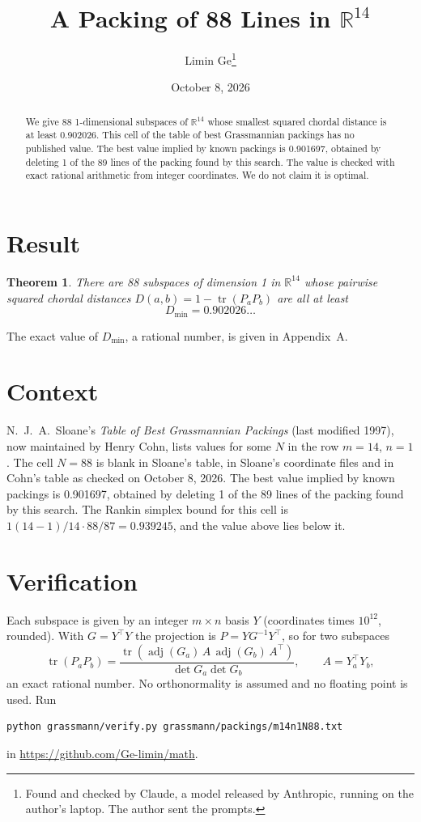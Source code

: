 \documentclass[11pt,a4paper]{article}
\title{A Packing of 88 Lines in $\mathbb{R}^{14}$}
\author{Limin Ge\thanks{Found and checked by Claude, a model released by Anthropic, running on the author's laptop. The author sent the prompts.}}
\date{October 8, 2026}
\newtheorem*{theorem}{Theorem}
\begin{document}
\maketitle
\begin{abstract}
We give 88 1-dimensional subspaces of $\mathbb{R}^{14}$ whose smallest squared chordal distance is at least 0.902026. This cell of the table of best Grassmannian packings has no published value. The best value implied by known packings is 0.901697, obtained by deleting 1 of the 89 lines of the packing found by this search. The value is checked with exact rational arithmetic from integer coordinates. We do not claim it is optimal.
\end{abstract}

\section{Result}
\begin{theorem}
There are 88 subspaces of dimension 1 in $\mathbb{R}^{14}$ whose pairwise squared chordal distances $D(a,b) = 1 - \operatorname{tr}(P_aP_b)$ are all at least
\[ D_{\min} = 0.902026\ldots \]
\end{theorem}
The exact value of $D_{\min}$, a rational number, is given in Appendix~A.


\section{Context}
N.~J.~A.~Sloane's \emph{Table of Best Grassmannian Packings} (last modified 1997), now maintained by Henry Cohn, lists values for some $N$ in the row $m=14$, $n=1$. The cell $N=88$ is blank in Sloane's table, in Sloane's coordinate files and in Cohn's table as checked on October 8, 2026. The best value implied by known packings is 0.901697, obtained by deleting 1 of the 89 lines of the packing found by this search. The Rankin simplex bound for this cell is $1(14-1)/14\cdot 88/87 = 0.939245$, and the value above lies below it.


\section{Verification}
Each subspace is given by an integer $m\times n$ basis $Y$ (coordinates times $10^{12}$, rounded). With $G=Y^\top Y$ the projection is $P=YG^{-1}Y^\top$, so for two subspaces
\[ \operatorname{tr}(P_aP_b)=\frac{\operatorname{tr}(\operatorname{adj}(G_a)\,A\,\operatorname{adj}(G_b)\,A^\top)}{\det G_a\det G_b},\qquad A=Y_a^\top Y_b, \]
an exact rational number. No orthonormality is assumed and no floating point is used. Run
\begin{verbatim}
python grassmann/verify.py grassmann/packings/m14n1N88.txt
\end{verbatim}
in \url{https://github.com/Ge-limin/math}.
\end{document}
